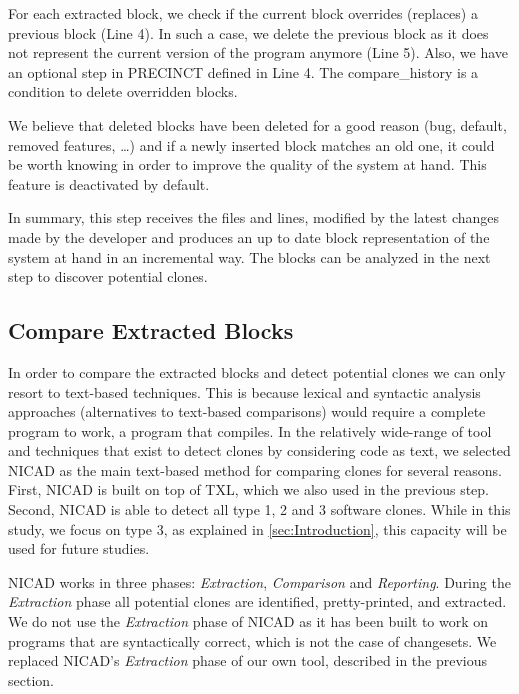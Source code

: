 \documentclass[conference]{IEEEtran}
\begin{document}



For each extracted block, we check if the current block overrides (replaces) a previous block (Line 4).
In such a case, we delete the previous block as it does not represent the current version of the program anymore (Line 5).
Also, we have an optional step in PRECINCT defined in Line 4. The compare\_history is a condition to delete overridden blocks.

We believe that deleted blocks have been deleted for a good reason (bug, default, removed features, \ldots) and if a newly inserted block matches an old one, it could be worth knowing in order to improve the quality of the system at hand.
This feature is deactivated by default.

In summary, this step receives the files and lines, modified by the latest changes made by the developer and produces an up to date block representation of the system at hand in an incremental way.
The blocks can be analyzed in the next step to discover potential clones.

\subsection{Compare Extracted Blocks}
\label{sub:Compare Extracted Blocks}

In order to compare the extracted blocks and detect potential clones we can only resort to text-based techniques.
This is because lexical and syntactic analysis approaches (alternatives to text-based comparisons) would require a complete program to work, a program that compiles.
In the relatively wide-range of tool and techniques that exist to detect clones by considering code as text\cite{Johnson1993,Johnson1994,Marcus,Manber1994,StephaneDucasse,Wettel2005}, we selected NICAD as the main text-based method for comparing clones \cite{Cordy2011} for several reasons.
First, NICAD is built on top of TXL, which we also used in the previous step.
Second, NICAD is able to detect all type 1, 2 and 3 software clones.
While in this study, we focus on type 3, as explained in \ref{sec:Introduction}, this capacity will be used for future studies.

NICAD  works in three phases: \textit{Extraction}, \textit{Comparison} and \textit{Reporting}. During the \textit{Extraction} phase all potential clones are identified, pretty-printed, and extracted.
We do not use the \textit{Extraction} phase of NICAD as it has been built to work on programs that are syntactically correct, which is not the case of changesets.
We replaced NICAD's \textit{Extraction} phase of our own tool, described in the previous section.
\end{document}
